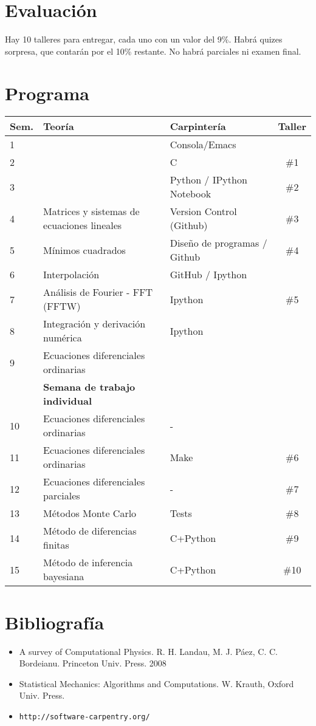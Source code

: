 \documentclass[12pt]{article}
\begin{document}
\section*{Evaluaci\'on}
Hay 10 talleres para entregar, cada uno con un valor del 9\%. Habr\'a  quizes sorpresa, que contar\'an por el 10\% restante. No habr\'a parciales ni examen final.

 
\section*{Programa}

\begin{center}
\begin{tabular}{|l|l|l|c|}
\hline
Sem. & Teor\'ia & Carpinter\'ia & Taller \\\hline
1 & 	&Consola/Emacs &\\
2 & 	&C  & \#1\\
3 & 	&Python / IPython Notebook & \#2\\
4 & Matrices y sistemas de ecuaciones lineales  & Version Control (Github) &\#3\\
5 & M\'inimos cuadrados & Dise\~no de programas / Github& \#4\\
6 & Interpolaci\'on & GitHub / Ipython& \\
7 & An\'alisis de Fourier - FFT  (FFTW)&  Ipython & \#5 \\
8 & Integraci\'on y derivaci\'on num\'erica & Ipython &\\
9 & Ecuaciones diferenciales ordinarias & &\\
 & {\bf Semana de trabajo individual} & &\\
10 & Ecuaciones diferenciales ordinarias &  - & \\
11 & Ecuaciones diferenciales ordinarias &  Make & \#6\\
12 & Ecuaciones diferenciales parciales &  - & \#7\\
13 & M\'etodos Monte Carlo &   Tests & \#8\\
14 & M\'etodo de diferencias finitas & C+Python & \#9\\
15 & M\'etodo de inferencia bayesiana& C+Python & \#10\\
\hline
\end{tabular}
\end{center}


\section*{Bibliograf\'ia}
\begin{itemize}
\item
A survey of Computational Physics. R. H. Landau, M. J. P\'aez, C. C.
Bordeianu. Princeton Univ. Press. 2008 
\item
Statistical Mechanics: Algorithms and Computations. W. Krauth, Oxford Univ. Press. 
\item\verb"http://software-carpentry.org/"
\end{itemize}

 
\end{document}
